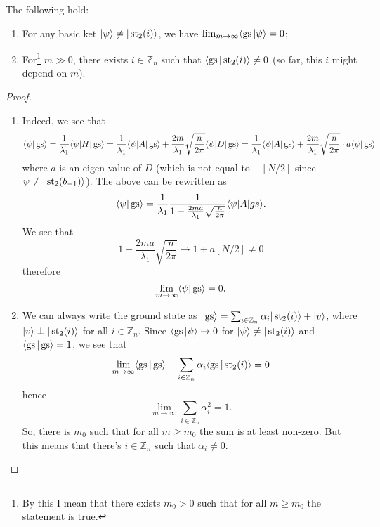 \begin{lemma} 
The following hold:
\begin{enumerate}
\item For any basic ket $|\psi\rangle \neq |\operatorname{st}_2(i)\rangle$, we have $\lim_{m \rightarrow \infty} \langle \operatorname{gs} | \psi \rangle = 0$;
\item For\footnote{By this I mean that there exists $m_0 > 0$ such that for all $m \geq m_0$ the statement is true.} $m \gg 0$, there exists $i \in \mathbb Z_n$ such that $\left\langle \operatorname{gs} | \operatorname{st}_2(i) \right\rangle \neq 0$ (so far, this $i$ might depend on $m$).
\end{enumerate}
\end{lemma}
\begin{proof}
\begin{enumerate}
\item Indeed, we see that
\[
\langle \psi | \operatorname{gs} \rangle = \frac{1}{\lambda_1} \langle \psi | H|\operatorname{gs}\rangle = \frac{1}{\lambda_1} \langle \psi |A|\operatorname{gs}\rangle + \frac{2m}{\lambda_1} \sqrt{\frac{n}{2\pi}} \langle \psi | D | \operatorname{gs} \rangle = \frac{1}{\lambda_1} \langle \psi |A|\operatorname{gs}\rangle + \frac{2m}{\lambda_1} \sqrt{\frac{n}{2\pi}} \cdot a \langle \psi | \operatorname{gs} \rangle
\]
where $a$ is an eigen-value of $D$ (which is not equal to $-[N/2]$ since $\psi \neq |\operatorname{st}_2(b_{-1})\rangle$). The above can be rewritten as
\[
\langle \psi | \operatorname{gs}\rangle = \frac{1}{\lambda_1} \frac{1}{1- \frac{2ma}{\lambda_1}\sqrt{\frac{n}{2\pi}} } \langle \psi | A | gs\rangle.
\]
We see that 
\[
1- \frac{2ma}{\lambda_1}\sqrt{\frac{n}{2\pi}} \rightarrow 1 + a [N/2] \neq 0
\]
therefore
\[
\lim_{m \rightarrow \infty}\langle \psi | \operatorname{gs} \rangle = 0.
\]
\item We can always write the ground state as $|\operatorname{gs}\rangle = \sum_{i \in \mathbb Z_n} \alpha_i |\operatorname{st}_2(i)\rangle + |v\rangle$, where $|v\rangle \perp |\operatorname{st}_2(i)\rangle$ for all $i \in \mathbb Z_n$. Since $\langle \operatorname{gs}|\psi \rangle \rightarrow 0$ for $|\psi\rangle \neq |\operatorname{st}_2(i)\rangle$ and $\langle \operatorname{gs} | \operatorname{gs}\rangle = 1$, we see that
\[
\lim_{m \rightarrow \infty} \langle \operatorname{gs} | \operatorname{gs} \rangle - \sum_{i \in \mathbb Z_n} \alpha_i\langle\operatorname{gs} |\operatorname{st}_2(i)\rangle = 0
\]
hence
\[
\lim_{m \rightarrow \infty} \sum_{i \in \mathbb Z_n} \alpha_i^2 = 1.
\]
So, there is $m_0$ such that for all $m \geq m_0$ the sum is at least non-zero. But this means that there's $i \in \mathbb Z_n$ such that $\alpha_i \neq 0$.

\end{enumerate}
\end{proof}

